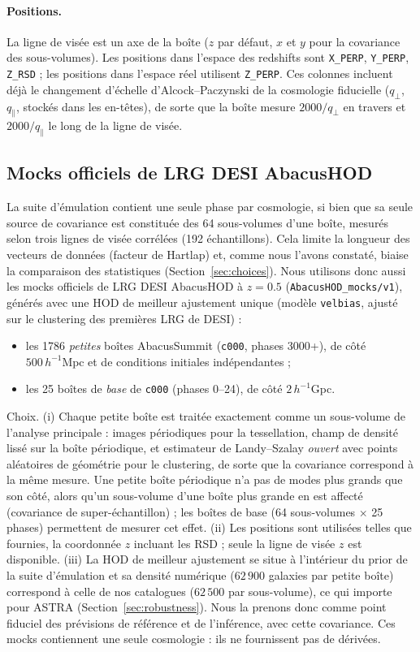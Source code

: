 \documentclass[11pt,twocolumn]{article}
\newcommand{\Mpch}{\,h^{-1}\mathrm{Mpc}}
\begin{document}
\paragraph{Positions.} La ligne de visée est un axe de la boîte ($z$ par défaut, $x$ et $y$ pour la covariance des sous-volumes). Les positions dans l'espace des redshifts sont \texttt{X\_PERP}, \texttt{Y\_PERP}, \texttt{Z\_RSD} ; les positions dans l'espace réel utilisent \texttt{Z\_PERP}. Ces colonnes incluent déjà le changement d'échelle d'Alcock--Paczynski de la cosmologie fiducielle ($q_\perp$, $q_\parallel$, stockés dans les en-têtes), de sorte que la boîte mesure $2000/q_\perp$ en travers et $2000/q_\parallel$ le long de la ligne de visée.

\subsection{Mocks officiels de LRG DESI AbacusHOD}
\label{sec:official}

La suite d'émulation contient une seule phase par cosmologie, si bien que sa seule source de covariance est constituée des 64 sous-volumes d'une boîte, mesurés selon trois lignes de visée corrélées (192 échantillons). Cela limite la longueur des vecteurs de données (facteur de Hartlap) et, comme nous l'avons constaté, biaise la comparaison des statistiques (Section~\ref{sec:choices}). Nous utilisons donc aussi les mocks officiels de LRG DESI AbacusHOD à $z=0.5$ \cite{Yuan2022} (\texttt{AbacusHOD\_mocks/v1}), générés avec une HOD de meilleur ajustement unique (modèle \texttt{velbias}, ajusté sur le clustering des premières LRG de DESI) :
\begin{itemize}
\item les 1786 \emph{petites} boîtes AbacusSummit (\texttt{c000}, phases 3000+), de côté $500\Mpch$ et de conditions initiales indépendantes ;
\item les 25 boîtes de \emph{base} de \texttt{c000} (phases 0--24), de côté $2\,h^{-1}$Gpc.
\end{itemize}
Choix. (i) Chaque petite boîte est traitée exactement comme un sous-volume de l'analyse principale : images périodiques pour la tessellation, champ de densité lissé sur la boîte périodique, et estimateur de Landy--Szalay \emph{ouvert} avec points aléatoires de géométrie pour le clustering, de sorte que la covariance correspond à la même mesure. Une petite boîte périodique n'a pas de modes plus grands que son côté, alors qu'un sous-volume d'une boîte plus grande en est affecté (covariance de super-échantillon) ; les boîtes de base (64 sous-volumes $\times$ 25 phases) permettent de mesurer cet effet. (ii) Les positions sont utilisées telles que fournies, la coordonnée $z$ incluant les RSD ; seule la ligne de visée $z$ est disponible. (iii) La HOD de meilleur ajustement se situe à l'intérieur du prior de la suite d'émulation et sa densité numérique ($62\,900$ galaxies par petite boîte) correspond à celle de nos catalogues ($62\,500$ par sous-volume), ce qui importe pour ASTRA (Section~\ref{sec:robustness}). Nous la prenons donc comme point fiduciel des prévisions de référence et de l'inférence, avec cette covariance. Ces mocks contiennent une seule cosmologie : ils ne fournissent pas de dérivées.
\end{document}
